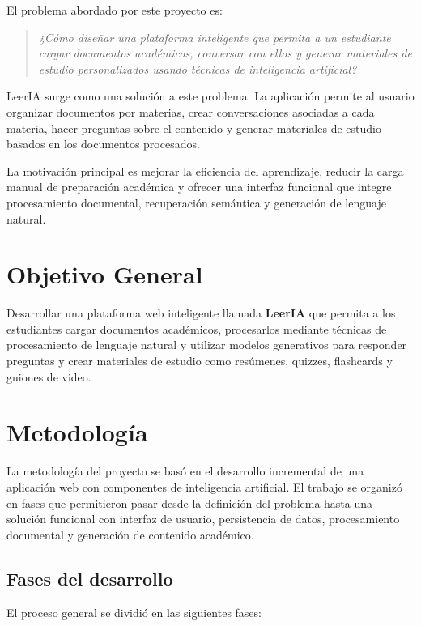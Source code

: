 \documentclass[12pt, letterpaper]{article}
\begin{document}
	El problema abordado por este proyecto es:
	
	\begin{quote}
		\textit{¿Cómo diseñar una plataforma inteligente que permita a un estudiante cargar documentos académicos, conversar con ellos y generar materiales de estudio personalizados usando técnicas de inteligencia artificial?}
	\end{quote}
	
	LeerIA surge como una solución a este problema. La aplicación permite al usuario organizar documentos por materias, crear conversaciones asociadas a cada materia, hacer preguntas sobre el contenido y generar materiales de estudio basados en los documentos procesados.
	
	La motivación principal es mejorar la eficiencia del aprendizaje, reducir la carga manual de preparación académica y ofrecer una interfaz funcional que integre procesamiento documental, recuperación semántica y generación de lenguaje natural.
	

	\section{Objetivo General}

	
	Desarrollar una plataforma web inteligente llamada \textbf{LeerIA} que permita a los estudiantes cargar documentos académicos, procesarlos mediante técnicas de procesamiento de lenguaje natural y utilizar modelos generativos para responder preguntas y crear materiales de estudio como resúmenes, quizzes, flashcards y guiones de video.
	

	\section{Metodología}
	
	La metodología del proyecto se basó en el desarrollo incremental de una aplicación web con componentes de inteligencia artificial. El trabajo se organizó en fases que permitieron pasar desde la definición del problema hasta una solución funcional con interfaz de usuario, persistencia de datos, procesamiento documental y generación de contenido académico.
	
	\subsection{Fases del desarrollo}
	
	El proceso general se dividió en las siguientes fases:
	
\end{document}

